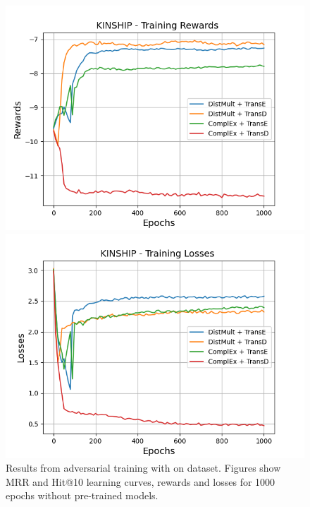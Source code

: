 \begin{figure}[H]
    \begin{minipage}{.5\textwidth}
      \centering
      \includegraphics[width=\linewidth]{figures/results/gan_train/not_pretrained/uncertainty/max/entropy/kinship/1k_epochs/uncertainty_kinship_rew.png}
    \end{minipage}%
     \begin{minipage}{.5\textwidth}
      \centering
      \includegraphics[width=\linewidth]{figures/results/gan_train/not_pretrained/uncertainty/max/entropy/kinship/1k_epochs/uncertainty_kinship_losses.png}
    \end{minipage}%
    \caption{Results from adversarial training with \usmax on \kinship dataset.
    Figures show MRR and Hit@10 learning curves, rewards and losses for 1000 epochs without pre-trained models.}
    \label{fig:gan_train_not_pretrained_usmax_kinship}
\end{figure}
